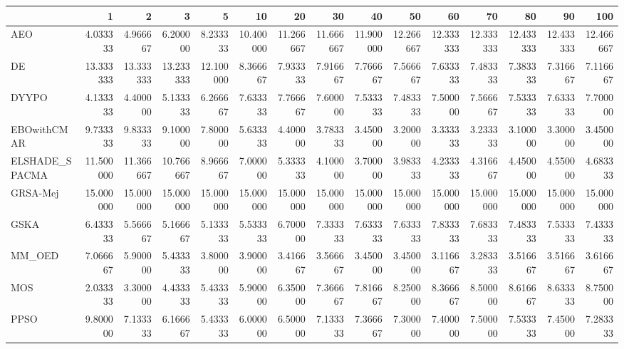 \begin{tabular}{lrrrrrrrrrrrrrr}
\toprule
{} &        1   &        2   &        3   &        5   &        10  &        20  &        30  &        40  &        50  &        60  &        70  &        80  &        90  &        100 \\
\midrule
AEO            &   4.033333 &   4.966667 &   6.200000 &   8.233333 &  10.400000 &  11.266667 &  11.666667 &  11.900000 &  12.266667 &  12.333333 &  12.333333 &  12.433333 &  12.433333 &  12.466667 \\
DE             &  13.333333 &  13.333333 &  13.233333 &  12.100000 &   8.366667 &   7.933333 &   7.916667 &   7.766667 &   7.566667 &   7.633333 &   7.483333 &   7.383333 &   7.316667 &   7.116667 \\
DYYPO          &   4.133333 &   4.400000 &   5.133333 &   6.266667 &   7.633333 &   7.766667 &   7.600000 &   7.533333 &   7.483333 &   7.500000 &   7.566667 &   7.533333 &   7.633333 &   7.700000 \\
EBOwithCMAR    &   9.733333 &   9.833333 &   9.100000 &   7.800000 &   5.633333 &   4.400000 &   3.783333 &   3.450000 &   3.200000 &   3.333333 &   3.233333 &   3.100000 &   3.300000 &   3.450000 \\
ELSHADE\_SPACMA &  11.500000 &  11.366667 &  10.766667 &   8.966667 &   7.000000 &   5.333333 &   4.100000 &   3.700000 &   3.983333 &   4.233333 &   4.316667 &   4.450000 &   4.550000 &   4.683333 \\
GRSA-Mej       &  15.000000 &  15.000000 &  15.000000 &  15.000000 &  15.000000 &  15.000000 &  15.000000 &  15.000000 &  15.000000 &  15.000000 &  15.000000 &  15.000000 &  15.000000 &  15.000000 \\
GSKA           &   6.433333 &   5.566667 &   5.166667 &   5.133333 &   5.533333 &   6.700000 &   7.333333 &   7.633333 &   7.633333 &   7.833333 &   7.683333 &   7.483333 &   7.533333 &   7.433333 \\
MM\_OED         &   7.066667 &   5.900000 &   5.433333 &   3.800000 &   3.900000 &   3.416667 &   3.566667 &   3.450000 &   3.450000 &   3.116667 &   3.283333 &   3.516667 &   3.516667 &   3.616667 \\
MOS            &   2.033333 &   3.300000 &   4.433333 &   5.433333 &   5.900000 &   6.350000 &   7.366667 &   7.816667 &   8.250000 &   8.366667 &   8.500000 &   8.616667 &   8.633333 &   8.750000 \\
PPSO           &   9.800000 &   7.133333 &   6.166667 &   5.433333 &   6.000000 &   6.500000 &   7.133333 &   7.366667 &   7.300000 &   7.400000 &   7.500000 &   7.533333 &   7.450000 &   7.283333 \\

\end{tabular}

